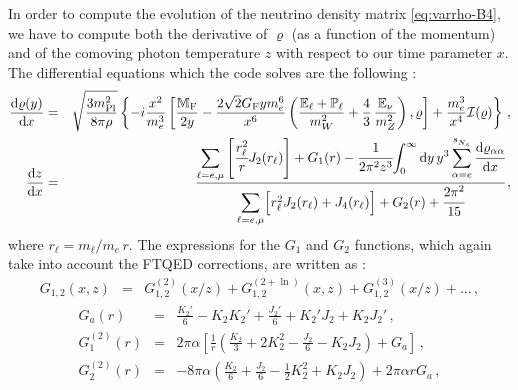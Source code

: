 \documentclass[notitlepage,nofootinbib,showpacs,preprintnumbers,amsmath,amssymb,superscriptaddress,prd,onecolumn]{revtex4-1}
\begin{document}
In order to compute the evolution of the neutrino density matrix \eqref{eq:varrho-B4},
we have to compute both the derivative of $\varrho$ (as a function of the momentum)
and of the comoving photon temperature $z$
with respect to our time parameter $x$.
The differential equations which the code solves are the following
\cite{deSalas:2016ztq,Mirizzi:2012we,Saviano:2013ktj,Mangano:2001iu}:
%
\begin{eqnarray}
\label{eq:drho_dx_nxn}
\frac{{\rm d}\varrho(y)}{{\rm d}x}
&=&
\sqrt{\frac{3 m^2_{\rm Pl}}{8\pi\rho}}
\left\{
    -i \frac{x^2}{m_e^3}
    \left[
        \frac{\mathbb{M}_{\rm F}}{2y}
        -
        \frac{2\sqrt{2}G_{\rm F} y m_e^6}{x^6}
        \left(
            \frac{\mathbb{E}_\ell+\mathbb{P}_\ell}{m_W^2}
            +
            \frac{4}{3}\,\frac{\mathbb{E}_\nu}{m_Z^2}
        \right),
    \varrho
    \right]
    +\frac{m_e^3}{x^4}\mathcal{I(\varrho)}
\right\}\,,
\nonumber\\
\label{eq:dz_dx_nxn}
\frac{\mathrm{d}z}{\mathrm{d}x}
&=&
\cfrac{
{\displaystyle \sum_{\ell=e,\mu}}
\left[
\cfrac{r_\ell^2}{r} J_2(r_\ell)
\right]
+ G_1(r)
- \cfrac{1}{2\pi^2z^3}
    {\displaystyle \int_0^\infty \mathrm{d}y\,y^3\sum_{\alpha=e}^{s_{N_s}^{}}\cfrac{\mathrm{d}\varrho_{\alpha \alpha}}{\mathrm{d}x}}
}{
{\displaystyle \sum_{\ell=e,\mu}}
\Big[
r^2_\ell J_2(r_\ell)
+ J_4(r_\ell)
\Big]
+ G_2(r)
+ \cfrac{2\pi^2}{15}
}\,,
\end{eqnarray}
where $r_\ell=m_\ell/m_e\,r$.
The expressions for the $G_1$ and $G_2$ functions,
which again take into account the FTQED corrections, are written as
\cite{Mangano:2001iu,Bennett:2019ewm}:
%
\begin{eqnarray}
G_{1,2}(x,z)
&=&
G_{1,2}^{(2)}(x/z)
+
G_{1,2}^{(2+\ln)}(x,z)
+
G_{1,2}^{(3)}(x/z)
+
\ldots
\,,
\end{eqnarray}
%
\begin{eqnarray}
G_a(r)
&=&
\frac{K_2'}{6}
-K_2K_2'
+\frac{J_2'}{6}
+K_2'J_2
+K_2J_2'
\,,\\
G_1^{(2)}(r)
&=&
2\pi\alpha
\left[
  \frac{1}{r}
  \left(
    \frac{K_2}{3}
    + 2 K_2^2
    -\frac{J_2}{6}
    -K_2J_2
  \right)
  +
  G_a
\right]
\label{eq:g1}
\,,\\
G_2^{(2)}(r)
&=&
-8\pi\alpha
\left(
  \frac{K_2}{6}
  +\frac{J_2}{6}
  -\frac{1}{2}K_2^2
  +K_2J_2
\right)
+
2\pi\alpha r
G_a
\label{eq:g2}
\,,
\end{eqnarray}
%
\end{document}
